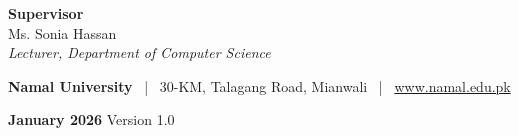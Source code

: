 \begin{titlepage}
    \vspace{0.4cm}
    
    {\fontsize{12}{14}\selectfont\bfseries Supervisor}\\[0.15cm]
    Ms. Sonia Hassan\\[0.05cm]
    {\small\textit{Lecturer, Department of Computer Science}}
    
    \vfill
    
    \noindent\makebox[\linewidth]{\textcolor{primaryblue}{\rule{0.8\paperwidth}{0.5pt}}}
    
    \vspace{0.2cm}
    
    {\fontsize{10}{12}\selectfont
    \textbf{Namal University} ~|~ 30-KM, Talagang Road, Mianwali ~|~ \href{https://www.namal.edu.pk}{www.namal.edu.pk}
    }
    
    \vspace{0.2cm}
    
    {\fontsize{14}{17}\selectfont\bfseries January 2026} \hspace{1cm} {\fontsize{10}{12}\selectfont Version 1.0}
    
    \vspace{0.2cm}
    
    \noindent\makebox[\linewidth]{\textcolor{primaryblue}{\rule{\paperwidth}{2pt}}}
    
\end{titlepage}
\newpage
